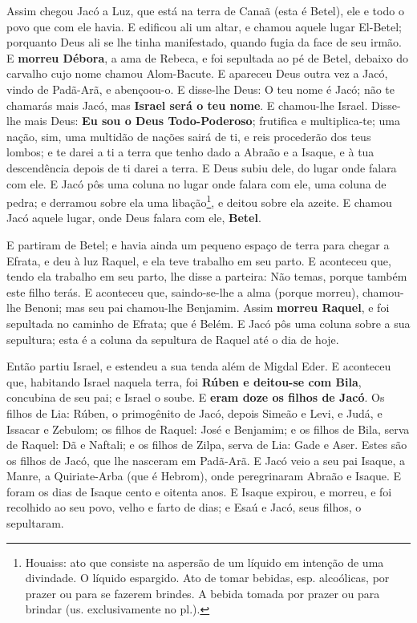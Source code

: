 Assim chegou Jacó a Luz, que está na terra de Canaã (esta é
Betel), ele e todo o povo que com ele havia. E edificou ali um
altar, e chamou aquele lugar El-Betel; porquanto Deus ali se lhe
tinha manifestado, quando fugia da face de seu irmão. E
\textbf{morreu Débora}, a ama de Rebeca, e foi sepultada ao pé de
Betel, debaixo do carvalho cujo nome chamou Alom-Bacute. E
apareceu Deus outra vez a Jacó, vindo de Padã-Arã, e abençoou-o.
E disse-lhe Deus: O teu nome é Jacó; não te chamarás mais
Jacó, mas \textbf{Israel será o teu nome}. E chamou-lhe Israel.
Disse-lhe mais Deus: \textbf{Eu sou o Deus Todo-Poderoso};
frutifica e multiplica-te; uma nação, sim, uma multidão de nações
sairá de ti, e reis procederão dos teus lombos; e te darei a
ti a terra que tenho dado a Abraão e a Isaque, e à tua descendência
depois de ti darei a terra. E Deus subiu dele, do lugar onde
falara com ele. E Jacó pôs uma coluna no lugar onde falara
com ele, uma coluna de pedra; e derramou sobre ela uma
libação\footnote{Houaiss: ato que consiste na aspersão de um líquido
em intenção de uma divindade. O líquido espargido. Ato de tomar
bebidas, esp. alcoólicas, por prazer ou para se fazerem brindes. A
bebida tomada por prazer ou para brindar (us. exclusivamente no
pl.).}, e deitou sobre ela azeite. E chamou Jacó aquele
lugar, onde Deus falara com ele, \textbf{Betel}.

E partiram de Betel; e havia ainda um pequeno espaço de terra
para chegar a Efrata, e deu à luz Raquel, e ela teve trabalho em seu
parto. E aconteceu que, tendo ela trabalho em seu parto, lhe
disse a parteira: Não temas, porque também este filho terás.
E aconteceu que, saindo-se-lhe a alma (porque morreu),
chamou-lhe Benoni; mas seu pai chamou-lhe Benjamim. Assim
\textbf{morreu Raquel}, e foi sepultada no caminho de Efrata; que é
Belém. E Jacó pôs uma coluna sobre a sua sepultura; esta é a
coluna da sepultura de Raquel até o dia de hoje.

Então partiu Israel, e estendeu a sua tenda além de Migdal Eder.
E aconteceu que, habitando Israel naquela terra, foi
\textbf{Rúben e deitou-se com Bila}, concubina de seu pai; e Israel
o soube. E \textbf{eram doze os filhos de Jacó}. Os filhos de
Lia: Rúben, o primogênito de Jacó, depois Simeão e Levi, e Judá, e
Issacar e Zebulom; os filhos de Raquel: José e Benjamim;
e os filhos de Bila, serva de Raquel: Dã e Naftali; e
os filhos de Zilpa, serva de Lia: Gade e Aser. Estes são os filhos
de Jacó, que lhe nasceram em Padã-Arã. E Jacó veio a seu pai
Isaque, a Manre, a Quiriate-Arba (que é Hebrom), onde peregrinaram
Abraão e Isaque. E foram os dias de Isaque cento e oitenta
anos. E Isaque expirou, e morreu, e foi recolhido ao seu
povo, velho e farto de dias; e Esaú e Jacó, seus filhos, o
sepultaram.


